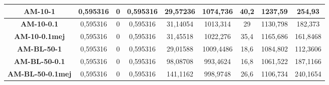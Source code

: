 \documentclass[12pt, spanish]{article}
\begin{document}
\begin{table}[H]
\begin{tabular}{|c|c|c|c|c|c|c|c|c|}
\textbf{AM-10-1}         & 0,595316                  & 0                           & 0,595316               & 29,57236   & 1074,736                  & 40,2                        & 1237,59                & 254,93     \\ \hline
\textbf{AM-10-0.1}       & 0,595316                  & 0                           & 0,595316               & 31,14054   & 1013,314                  & 29                          & 1130,798               & 182,373    \\ \hline
\textbf{AM-10-0.1mej}    & 0,595316                  & 0                           & 0,595316               & 31,45518   & 1022,276                  & 35,4                        & 1165,686               & 161,8468   \\ \hline
\textbf{AM-BL-50-1}      & 0,595316                  & 0                           & 0,595316               & 29,01588   & 1009,4486                 & 18,6                        & 1084,802               & 112,3606   \\ \hline
\textbf{AM-BL-50-0.1}    & 0,595316                  & 0                           & 0,595316               & 98,08708   & 993,4624                  & 16,8                        & 1061,522               & 187,1166   \\ \hline
\textbf{AM-BL-50-0.1mej} & 0,595316                  & 0                           & 0,595316               & 141,1162   & 998,9748                  & 26,6                        & 1106,734               & 240,1654   \\ \hline
\end{tabular}
\end{table}
\end{document}
